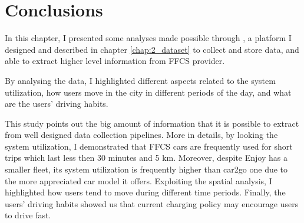 \section{Conclusions}
\label{sec:3_6_conclusion}

In this chapter, I presented some analyses made possible through \tool, a platform I designed and described in chapter \ref{chap:2_dataset} to collect and store data, and able to extract higher level information from FFCS provider.

By analysing the data, I highlighted different aspects related to the system utilization, how users move in the city in different periods of the day, and what are the users' driving habits.

This study points out the big amount of information that it is possible to extract from well designed data collection pipelines. More in details, by looking the system utilization, I demonstrated that FFCS cars are frequently used for short trips which last less then 30 minutes and 5 km. Moreover, despite Enjoy has a smaller fleet, its system utilization is frequently higher than car2go one due to the more appreciated car model it offers. Exploiting the spatial analysis, I highlighted how users tend to move during different time periods. Finally, the users' driving habits showed us that current charging policy may encourage users to drive fast. 